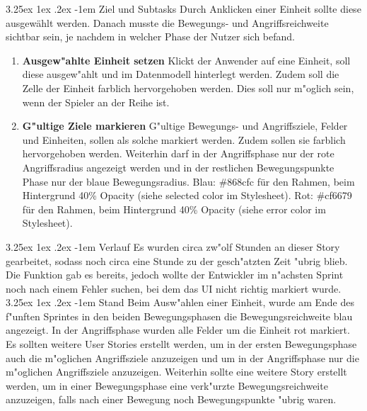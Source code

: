 \documentclass[12pt, titlepage]{scrartcl}
\makeatletter
\renewcommand\paragraph{\@startsection{paragraph}{5}{\z@}%
  {3.25ex \@plus1ex \@minus.2ex}%
  {-1em}%
  {\normalfont\normalsize\bfseries}}
\makeatother
\begin{document}
	            \paragraph{Ziel und Subtasks}
	               	Durch Anklicken einer Einheit sollte diese ausgew\"ahlt werden. Danach musste die Bewegungs- und Angriffsreichweite sichtbar sein, je nachdem in welcher Phase der Nutzer sich befand.
	           		\begin{enumerate}[label={}]
	           			\item \textbf{Ausgew"ahlte Einheit setzen} \hspace{5pt} Klickt der Anwender auf eine Einheit, soll diese ausgew"ahlt und im Datenmodell hinterlegt werden. Zudem soll die Zelle der Einheit farblich hervorgehoben werden. Dies soll nur m"oglich sein, wenn der Spieler an der Reihe ist.
	           			\item \textbf{G"ultige Ziele markieren} \hspace{5pt} G"ultige Bewegungs- und Angriffsziele, Felder und Einheiten, sollen als solche markiert werden. Zudem sollen sie farblich hervorgehoben werden. Weiterhin darf in der Angriffsphase nur der rote Angriffsradius angezeigt werden und in der restlichen Bewegungspunkte Phase nur der blaue Bewegungsradius. Blau: \#868cfc f\"ur den Rahmen, beim Hintergrund 40\% Opacity (siehe selected color im Stylesheet). Rot: \#cf6679 f\"ur den Rahmen, beim Hintergrund 40\% Opacity (siehe error color im Stylesheet).
	           		\end{enumerate}
           		\paragraph{Verlauf}
           			Es wurden circa zw"olf Stunden an dieser Story gearbeitet, sodass noch circa eine Stunde zu der gesch"atzten Zeit "ubrig blieb. Die Funktion gab es bereits, jedoch wollte der Entwickler im n"achsten Sprint noch nach einem Fehler suchen, bei dem das UI nicht richtig markiert wurde.
           		\paragraph{Stand}
           			Beim Ausw"ahlen einer Einheit, wurde am Ende des f"unften Sprintes in den beiden Bewegungsphasen die Bewegungsreichweite blau angezeigt. In der Angriffsphase wurden alle Felder um die Einheit rot markiert. Es sollten weitere User Stories erstellt werden, um in der ersten Bewegungsphase auch die m"oglichen Angriffsziele anzuzeigen und um in der Angriffsphase nur die m"oglichen Angriffsziele anzuzeigen. Weiterhin sollte eine weitere Story erstellt werden, um in einer Bewegungsphase eine verk"urzte Bewegungsreichweite anzuzeigen, falls nach einer Bewegung noch Bewegungspunkte "ubrig waren.
\end{document}
